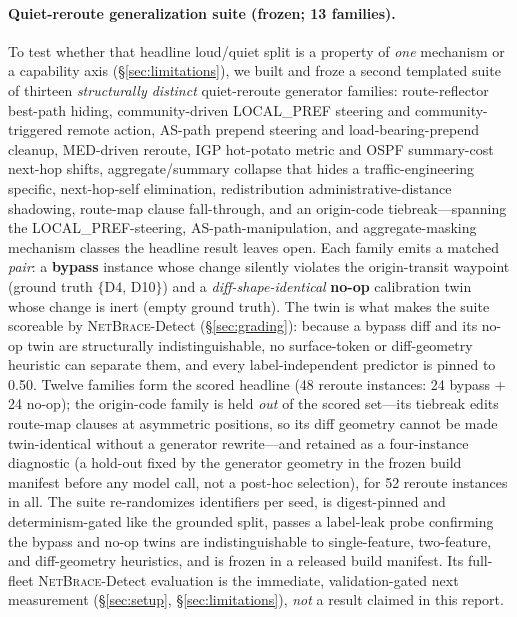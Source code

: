 \documentclass[11pt]{article}
\newcommand{\netbrace}{\textsc{NetBrace}}
\begin{document}
\paragraph{Quiet-reroute generalization suite (frozen; 13 families).} To test
whether that headline loud/quiet split is a property of \emph{one} mechanism or
a capability axis (\S\ref{sec:limitations}), we built and froze a second
templated suite of thirteen \emph{structurally distinct} quiet-reroute generator
families: route-reflector best-path hiding, community-driven LOCAL\_PREF
steering and community-triggered remote action, AS-path prepend steering and
load-bearing-prepend cleanup, MED-driven reroute, IGP hot-potato metric and OSPF
summary-cost next-hop shifts, aggregate/summary collapse that hides a
traffic-engineering specific, next-hop-self elimination, redistribution
administrative-distance shadowing, route-map clause fall-through, and an
origin-code tiebreak---spanning the LOCAL\_PREF-steering, AS-path-manipulation,
and aggregate-masking mechanism classes the headline result leaves open. Each
family emits a matched \emph{pair}: a \textbf{bypass} instance whose change
silently violates the origin-transit waypoint (ground truth $\{$D4, D10$\}$) and
a \emph{diff-shape-identical} \textbf{no-op} calibration twin whose change is
inert (empty ground truth). The twin is what makes the suite scoreable by
\netbrace{}-Detect (\S\ref{sec:grading}): because a bypass diff and its no-op
twin are structurally indistinguishable, no surface-token or diff-geometry
heuristic can separate them, and every label-independent predictor is pinned to
0.50. Twelve families form the scored headline (48 reroute instances: 24 bypass
$+$ 24 no-op); the origin-code family is held \emph{out} of the scored set---its
tiebreak edits route-map clauses at asymmetric positions, so its diff geometry
cannot be made twin-identical without a generator rewrite---and retained as a
four-instance diagnostic (a hold-out fixed by the generator geometry in the
frozen build manifest before any model call, not a post-hoc selection), for 52
reroute instances in all. The suite re-randomizes
identifiers per seed, is digest-pinned and determinism-gated like the grounded
split, passes a label-leak probe confirming the bypass and no-op twins are
indistinguishable to single-feature, two-feature, and diff-geometry heuristics,
and is frozen in a released build manifest. Its full-fleet
\netbrace{}-Detect evaluation is the immediate, validation-gated next measurement
(\S\ref{sec:setup}, \S\ref{sec:limitations}), \emph{not} a result claimed in
this report.
\end{document}

